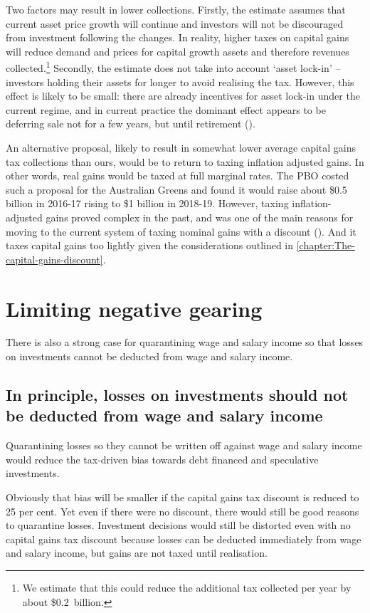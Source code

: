 \documentclass{grattanAlpha}\usepackage[]{graphicx}\usepackage[]{color}
\begin{document}
Two factors may result in lower collections. 
Firstly, the estimate assumes that current asset price growth will continue and investors will not be discouraged from investment following the changes. 
In reality, higher taxes on capital gains will reduce demand and prices for capital growth assets and therefore revenues collected.\footnote{We estimate that this could reduce the additional tax collected per year by about \$0.2~billion.} 
Secondly, the estimate does not take into account ‘asset lock-in’ – investors holding their assets for longer to avoid realising the tax. 
However, this effect is likely to be small: there are already incentives for asset lock-in under the current regime, and in current practice the dominant effect appears to be deferring sale not for a few years, but until retirement (). 

An alternative proposal, likely to result in somewhat lower average capital gains tax collections than ours, would be to return to taxing inflation adjusted gains.  
In other words, real gains would be taxed at full marginal rates. The PBO costed such a proposal for the Australian Greens and found it would raise about \$0.5 billion in 2016-17 rising to \$1 billion in 2018-19.  
However, taxing inflation-adjusted gains proved complex in the past, and was one of the main reasons for moving to the current system of taxing nominal gains with a discount (). 
And it taxes capital gains too lightly given the considerations outlined in \cref{chapter:The-capital-gains-discount}.

\section{Limiting negative gearing}
There is also a strong case for quarantining wage and salary income so that losses on investments cannot be deducted from wage and salary income. 
\subsection{In principle, losses on investments should not be deducted from wage and salary income}\label{subsec:In-principle-losses-should-not-be-deducted-from-salary}
Quarantining losses so they cannot be written off against wage and salary income would reduce the tax-driven bias towards debt financed and speculative investments. 

Obviously that bias will be smaller if the capital gains tax discount is reduced to 25 per cent. 
Yet even if there were no discount, there would still be good reasons to quarantine losses. Investment decisions would still be distorted even with no capital gains tax discount because losses can be deducted immediately from wage and salary income, but gains are not taxed until realisation.
\end{document}
